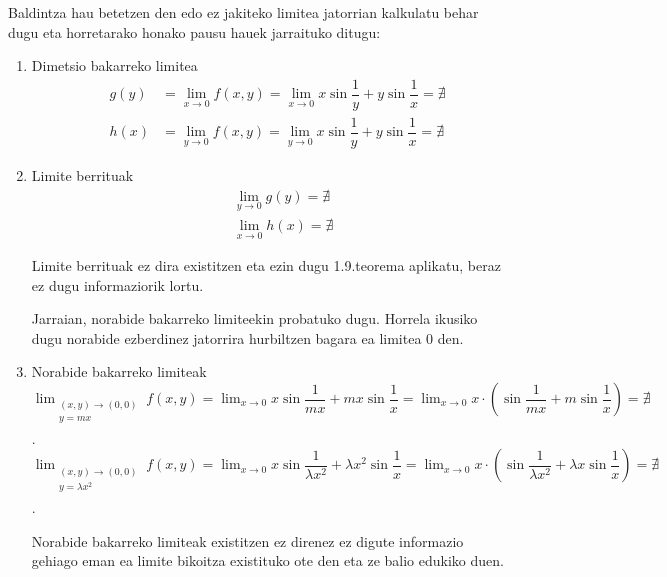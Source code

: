 Baldintza hau betetzen den edo ez jakiteko limitea jatorrian kalkulatu behar dugu eta horretarako honako pausu hauek jarraituko ditugu:
\begin{enumerate}
    \item Dimetsio bakarreko limitea
    \begin{eqnarray*}
        &g(y)&=\lim_{x \to 0}f(x,y)=\lim_{x \to 0} x\sin \dfrac{1}{y} +y \sin \dfrac{1}{x}= \nexists\\
        &h(x)&=\lim_{y \to 0}f(x,y)=\lim_{y \to 0} x\sin \dfrac{1}{y} +y \sin \dfrac{1}{x}= \nexists
    \end{eqnarray*}
    
    \item Limite berrituak
    \begin{eqnarray*}
        &&\lim_{y \to 0}g(y)=\nexists\\
        &&\lim_{x \to 0}h(x)=\nexists
    \end{eqnarray*}
    
    Limite berrituak ez dira existitzen eta ezin dugu 1.9.teorema aplikatu, beraz ez dugu informaziorik lortu. 
    
    Jarraian, norabide bakarreko limiteekin probatuko dugu. Horrela ikusiko dugu norabide ezberdinez jatorrira hurbiltzen bagara ea limitea 0 den.
    \item Norabide bakarreko limiteak \newline
    \newline
    $\displaystyle{ \lim_{ \begin{array}{c} \scriptstyle (x,y) \rightarrow (0,0) \\ \scriptstyle y=mx \\ \end{array} } f(x,y)= \lim_{x \rightarrow 0} x\sin \dfrac{1}{mx} +mx \sin \dfrac{1}{x}=\lim_{x \rightarrow 0} x\cdot\left(\sin \dfrac{1}{mx} +m \sin \dfrac{1}{x}\right)=\nexists } $.
    \newline
    $\displaystyle{ \lim_{ \begin{array}{c} \scriptstyle (x,y) \rightarrow (0,0) \\ \scriptstyle y=\lambda x^2 \\ \end{array} }f(x,y)= \lim_{x \rightarrow 0} x\sin \dfrac{1}{\lambda x^2} +\lambda x^2 \sin \dfrac{1}{x}=\lim_{x \rightarrow 0} x\cdot\left(\sin \dfrac{1}{\lambda x^2} +\lambda x \sin \dfrac{1}{x}\right)=\nexists } $.
    
    Norabide bakarreko limiteak existitzen ez direnez ez digute informazio gehiago eman ea limite bikoitza existituko ote den eta ze balio edukiko duen. 
    

\end{enumerate}
